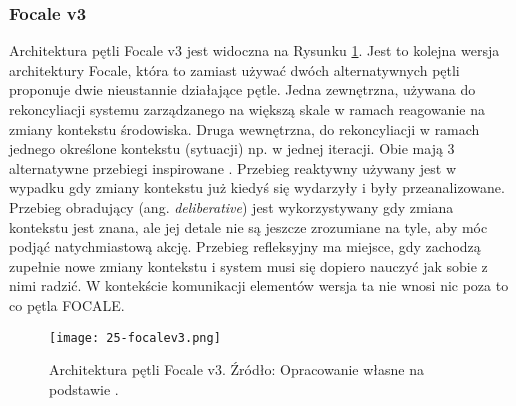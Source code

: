 \subsubsection{Focale v3}
Architektura pętli Focale v3 \cite{strassner2009} jest widoczna na Rysunku \ref{fig:25-focalev3}. Jest to kolejna wersja architektury Focale, która to zamiast używać dwóch alternatywnych pętli proponuje dwie nieustannie działające pętle. Jedna zewnętrzna, używana do rekoncyliacji systemu zarządzanego na większą skale w ramach reagowanie na zmiany kontekstu środowiska. Druga wewnętrzna, do rekoncyliacji w ramach jednego określone kontekstu (sytuacji) np. w jednej iteracji. Obie mają 3 alternatywne przebiegi inspirowane \cite{minsky1986}. Przebieg reaktywny używany jest w wypadku gdy zmiany kontekstu już kiedyś się wydarzyły i były przeanalizowane. Przebieg obradujący (ang. \textit{deliberative}) jest wykorzystywany gdy zmiana kontekstu jest znana, ale jej detale nie są jeszcze zrozumiane na tyle, aby móc podjąć natychmiastową akcję. Przebieg refleksyjny ma miejsce, gdy zachodzą zupełnie nowe zmiany kontekstu i system musi się dopiero nauczyć jak sobie z nimi radzić. W kontekście komunikacji elementów wersja ta nie wnosi nic poza to co pętla FOCALE.

\begin{figure}[!h]
    \centering \texttt{[image: 25-focalev3.png]}
    \caption{Architektura pętli Focale v3. Źródło: Opracowanie własne na podstawie \cite{etsieni2024}.}\label{fig:25-focalev3}
\end{figure}
